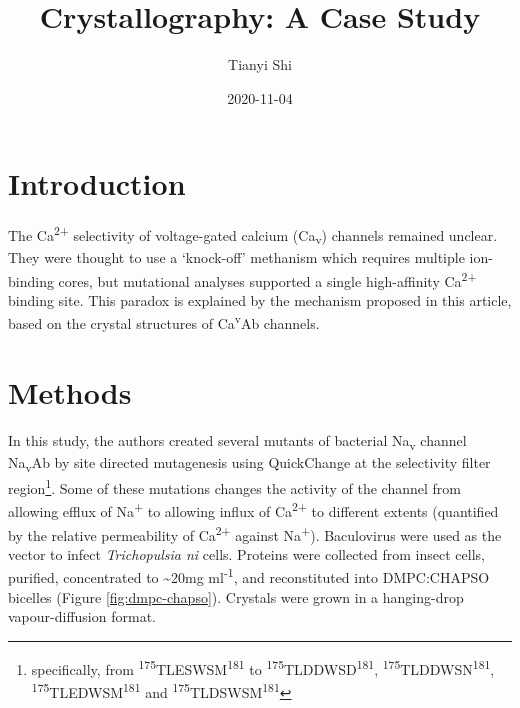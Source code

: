 \documentclass[
]{article}
\title{Crystallography: A Case Study}
\author{Tianyi Shi}
\date{2020-11-04}
\begin{document}
\maketitle

{
\setcounter{tocdepth}{2}
\tableofcontents
}
\hypertarget{introduction}{%
\section{Introduction}\label{introduction}}

The Ca\textsuperscript{2+} selectivity of voltage-gated calcium (Ca\textsubscript{v}) channels remained unclear. They were thought to use a `knock-off' methanism which requires multiple ion-binding cores, but mutational analyses supported a single high-affinity Ca\textsuperscript{2+} binding site. This paradox is explained by the mechanism proposed in this article, based on the crystal structures of Ca\textsuperscript{v}Ab channels.

\hypertarget{methods}{%
\section{Methods}\label{methods}}

In this study, the authors created several mutants of bacterial Na\textsubscript{v} channel Na\textsubscript{v}Ab by site directed mutagenesis using QuickChange at the selectivity filter region\footnote{specifically, from \textsuperscript{175}TLESWSM\textsuperscript{181} to \textsuperscript{175}TLDDWSD\textsuperscript{181}, \textsuperscript{175}TLDDWSN\textsuperscript{181}, \textsuperscript{175}TLEDWSM\textsuperscript{181} and \textsuperscript{175}TLDSWSM\textsuperscript{181}}. Some of these mutations changes the activity of the channel from allowing efflux of Na\textsuperscript{+} to allowing influx of Ca\textsuperscript{2+} to different extents (quantified by the relative permeability of Ca\textsuperscript{2+} against Na\textsuperscript{+}). Baculovirus were used as the vector to infect \emph{Trichopulsia ni} cells. Proteins were collected from insect cells, purified, concentrated to \textasciitilde20mg ml\textsuperscript{-1}, and reconstituted into DMPC:CHAPSO bicelles (Figure \ref{fig:dmpc-chapso}). Crystals were grown in a hanging-drop vapour-diffusion format.
\end{document}
